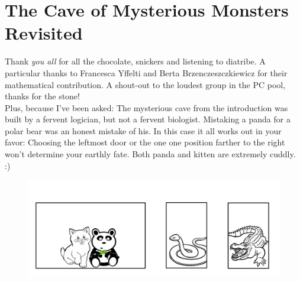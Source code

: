 \documentclass[hidelinks]{scrartcl}
\begin{document}

\section{The Cave of Mysterious Monsters Revisited}
Thank \textit{you all} for all the chocolate, snickers and listening to diatribe. A particular thanks to Francesca Yffelti and Berta Brzenczeszczkiewicz for their mathematical contribution. A shout-out to the loudest group in the PC pool, thanks for the stone! \\
Plus, because I've been asked: The mysterious cave from the introduction was built by a fervent logician, but not a fervent biologist. Mistaking a panda for a polar bear was an honest mistake of his. In this case it all works out in your favor: Choosing the leftmost door or the one one position farther to the right won't determine your earthly fate. Both panda and kitten are extremely cuddly. :)

\begin{figure}[H]
	\label{img:plus_panda}
	\centering
	\includegraphics[width=1\textwidth]{Illustrations/doors_animals_panda.png}
\end{figure} 
\end{document}

